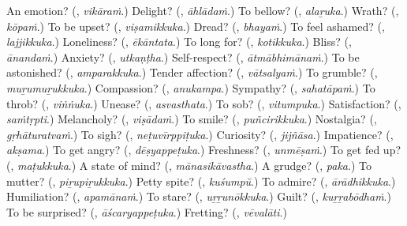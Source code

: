 \begin{tcolorbox}[breakable,colback=teal!4,colframe=teal!35!black,title={Before you move on}]
An emotion? (\textbf{}, \emph{vikāraṁ}.) Delight? (\textbf{}, \emph{āhlādaṁ}.) To bellow? (\textbf{}, \emph{alaṟuka}.) Wrath? (\textbf{}, \emph{kōpaṁ}.) To be upset? (\textbf{}, \emph{viṣamikkuka}.) Dread? (\textbf{}, \emph{bhayaṁ}.) To feel ashamed? (\textbf{}, \emph{lajjikkuka}.) Loneliness? (\textbf{}, \emph{ēkāntata}.) To long for? (\textbf{}, \emph{kotikkuka}.) Bliss? (\textbf{}, \emph{ānandaṁ}.) Anxiety? (\textbf{}, \emph{utkaṇṭha}.) Self-respect? (\textbf{}, \emph{ātmābhimānaṁ}.) To be astonished? (\textbf{}, \emph{amparakkuka}.) Tender affection? (\textbf{}, \emph{vātsalyaṁ}.) To grumble? (\textbf{}, \emph{muṟumuṟukkuka}.) Compassion? (\textbf{}, \emph{anukampa}.) Sympathy? (\textbf{}, \emph{sahatāpaṁ}.) To throb? (\textbf{}, \emph{viṅṅuka}.) Unease? (\textbf{}, \emph{asvasthata}.) To sob? (\textbf{}, \emph{vitumpuka}.) Satisfaction? (\textbf{}, \emph{saṁtṛpti}.) Melancholy? (\textbf{}, \emph{viṣādaṁ}.) To smile? (\textbf{}, \emph{puñcirikkuka}.) Nostalgia? (\textbf{}, \emph{gṛhāturatvaṁ}.) To sigh? (\textbf{}, \emph{neṭuvīrppiṭuka}.) Curiosity? (\textbf{}, \emph{jijñāsa}.) Impatience? (\textbf{}, \emph{akṣama}.) To get angry? (\textbf{}, \emph{dēṣyappeṭuka}.) Freshness? (\textbf{}, \emph{unmēṣaṁ}.) To get fed up? (\textbf{}, \emph{maṭukkuka}.) A state of mind? (\textbf{}, \emph{mānasikāvastha}.) A grudge? (\textbf{}, \emph{paka}.) To mutter? (\textbf{}, \emph{piṟupiṟukkuka}.) Petty spite? (\textbf{}, \emph{kuśumpŭ}.) To admire? (\textbf{}, \emph{ārādhikkuka}.) Humiliation? (\textbf{}, \emph{apamānaṁ}.) To stare? (\textbf{}, \emph{uṟṟunōkkuka}.) Guilt? (\textbf{}, \emph{kuṟṟabōdhaṁ}.) To be surprised? (\textbf{}, \emph{āścaryappeṭuka}.) Fretting? (\textbf{}, \emph{vēvalāti}.)
\end{tcolorbox}
